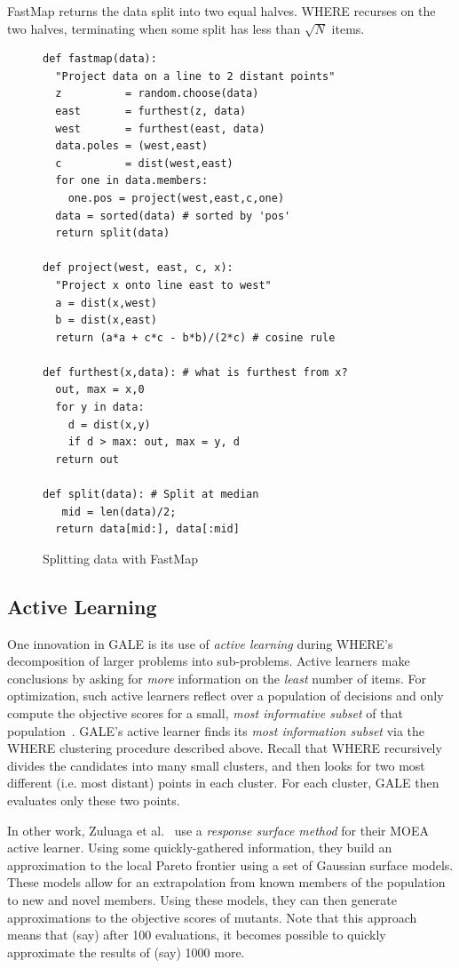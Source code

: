 \documentclass[10pt,journal,compsoc]{IEEEtran}
\newcommand{\ADD}[1]{#1}
\begin{document}
FastMap returns the data split into two equal halves.
WHERE recurses on the two halves, terminating when some split has less than $\sqrt{N}$ items.


\begin{figure}[!t] 
\begin{minipage}{3.2in}
\begin{lstlisting}[mathescape,frame=r,numbers=right]
def fastmap(data): 
  "Project data on a line to 2 distant points"
  z          = random.choose(data)
  east       = furthest(z, data)
  west       = furthest(east, data)
  data.poles = (west,east)
  c          = dist(west,east)     
  for one in data.members: 
    one.pos = project(west,east,c,one)
  data = sorted(data) # sorted by 'pos'
  return split(data)

def project(west, east, c, x): 
  "Project x onto line east to west"
  a = dist(x,west)
  b = dist(x,east)
  return (a*a + c*c - b*b)/(2*c) # cosine rule

def furthest(x,data): # what is furthest from x?
  out, max = x,0
  for y in data:
    d = dist(x,y)
    if d > max: out, max = y, d
  return out

def split(data): # Split at median
   mid = len(data)/2; 
  return data[mid:], data[:mid]
\end{lstlisting}
\caption{Splitting data with FastMap}
\label{fig:fastmapCode}  
\end{minipage}
\end{figure}

\subsection{Active Learning}

One innovation in GALE is its use of  {\em active learning} during WHERE's decomposition of larger problems into sub-problems.
Active learners make conclusions by asking for {\em more} information on the {\em least} number of items.  
For optimization,  such active learners reflect over a population of decisions and only compute the objective scores for a small, {\em most informative subset} of that population~\cite{Zuluaga:13}. 
GALE's active learner finds its {\em most information subset} via the WHERE clustering procedure described above.
Recall that
WHERE recursively divides the candidates into many small clusters, and then looks for two most different (i.e. most distant) points in each cluster. 
For each cluster, GALE then evaluates only these two points. 

In other work, Zuluaga et al.~\cite{Zuluaga:13} use a {\em response surface method} for their MOEA active learner.  
Using some quickly-gathered information, they build an approximation to the local Pareto frontier using a set of Gaussian surface models. 
These models allow for an extrapolation from \ADD{known members of the
population to new and novel members}.  
Using these models, they can then generate approximations to the objective scores of mutants. 
Note that this approach means that (say) after 100 evaluations, it becomes possible to quickly approximate the results of (say) 1000 more.
\end{document}
